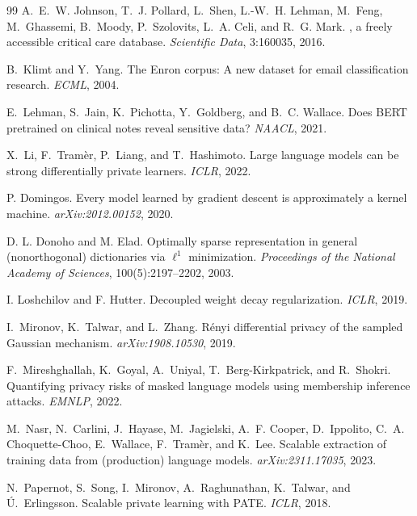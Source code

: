 \documentclass[11pt]{article}
\theoremstyle{plain}
\theoremstyle{definition}
\begin{document}
\begin{thebibliography}{99}
A.~E.~W. Johnson, T.~J. Pollard, L.~Shen, L.-W.~H. Lehman, M.~Feng, M.~Ghassemi, B.~Moody, P.~Szolovits, L.~A. Celi, and R.~G. Mark.
, a freely accessible critical care database. \emph{Scientific Data}, 3:160035, 2016.

B.~Klimt and Y.~Yang.
\newblock The {Enron} corpus: A new dataset for email classification research. \emph{ECML}, 2004.

E.~Lehman, S.~Jain, K.~Pichotta, Y.~Goldberg, and B.~C. Wallace.
\newblock Does {BERT} pretrained on clinical notes reveal sensitive data? \emph{NAACL}, 2021.

X.~Li, F.~Tram{\`e}r, P.~Liang, and T.~Hashimoto.
\newblock Large language models can be strong differentially private learners. \emph{ICLR}, 2022.

P. Domingos. Every model learned by gradient descent is approximately a kernel machine. \emph{arXiv:2012.00152}, 2020.

D. L. Donoho and M. Elad. Optimally sparse representation in general (nonorthogonal) dictionaries via $\ell^1$ minimization. \emph{Proceedings of the National Academy of Sciences}, 100(5):2197--2202, 2003.

I. Loshchilov and F. Hutter. Decoupled weight decay regularization. \emph{ICLR}, 2019.

I.~Mironov, K.~Talwar, and L.~Zhang.
\newblock R{\'e}nyi differential privacy of the sampled {G}aussian mechanism. \emph{arXiv:1908.10530}, 2019.

F.~Mireshghallah, K.~Goyal, A.~Uniyal, T.~Berg-Kirkpatrick, and R.~Shokri.
\newblock Quantifying privacy risks of masked language models using membership inference attacks. \emph{EMNLP}, 2022.

M.~Nasr, N.~Carlini, J.~Hayase, M.~Jagielski, A.~F. Cooper, D.~Ippolito, C.~A. Choquette-Choo, E.~Wallace, F.~Tram{\`e}r, and K.~Lee.
\newblock Scalable extraction of training data from (production) language models. \emph{arXiv:2311.17035}, 2023.

N.~Papernot, S.~Song, I.~Mironov, A.~Raghunathan, K.~Talwar, and {\'U}.~Erlingsson.
\newblock Scalable private learning with {PATE}. \emph{ICLR}, 2018.


\end{thebibliography}
\end{document}

